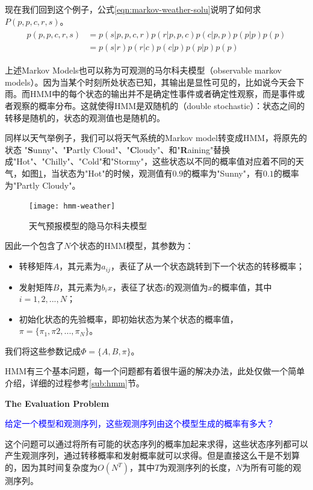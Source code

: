 现在我们回到这个例子，公式\ref{eqn:markov-weather-solu}说明了如何求$P(p,p,c,r,s)$。
\begin{align}
\label{eqn:markov-weather-solu}
\begin{split}
  p(p,p,c,r,s) &= p(s|p,p,c,r)p(r|p,p,c)p(c|p,p)p(p|p)p(p) \\
               &= p(s|r) p(r|c) p(c|p) p(p|p) p(p)
\end{split}
\end{align}

上述Markov Models也可以称为可观测的马尔科夫模型（observable markov models）。因为当某个时刻所处状态已知，其输出是显性可见的，比如说今天会下雨。而HMM中的每个状态的输出并不是确定性事件或者确定性观察，而是事件或者观察的概率分布。这就使得HMM是双随机的（double stochastic）：状态之间的转移是随机的，状态的观测值也是随机的。

同样以天气举例子，我们可以将天气系统的Markov model转变成HMM，将原先的状态 "{\bf S}unny"、"{\bf P}artly Cloud"、"{\bf C}loudy"、和"{\bf R}aining"替换成"Hot"、"Chilly"、"Cold"和"Stormy"，这些状态以不同的概率值对应着不同的天气，如图\ref{fig:hmm-we}，当状态为"Hot"的时候，观测值有$0.9$的概率为"Sunny"，有$0.1$的概率为"Partly Cloudy"。
\begin{figure}[htbp]
  \centering
  \texttt{[image: hmm-weather]}
  \caption{天气预报模型的隐马尔科夫模型\label{fig:hmm-we}}
\end{figure}

因此一个包含了$N$个状态的HMM模型，其参数为：
\begin{itemize}
  \item 转移矩阵$A$，其元素为$a_{ij}$，表征了从一个状态跳转到下一个状态的转移概率；
  \item 发射矩阵$B$，其元素为$b_i{x}$，表征了状态$i$的观测值为$x$的概率值，其中$i=1,2,...,N$；
  \item 初始化状态的先验概率，即初始状态为某个状态的概率值，$\pi=\{\pi_{1}, \pi{2},...,\pi_{N}\}$。
\end{itemize}

我们将这些参数记成$\Phi=\{A,B,\pi\}$。

HMM有三个基本问题，每一个问题都有着很牛逼的解决办法，此处仅做一个简单介绍，详细的过程参考\ref{sub:hmm}节。

{\bf The Evaluation Problem}

\textcolor{blue}{给定一个模型和观测序列，这些观测序列由这个模型生成的概率有多大？}

这个问题可以通过将所有可能的状态序列的概率加起来求得，这些状态序列都可以产生观测序列，通过转移概率和发射概率就可以求得。但是直接这么干是不划算的，因为其时间复杂度为$O(N^{T})$，其中$T$为观测序列的长度，$N$为所有可能的观测序列。

